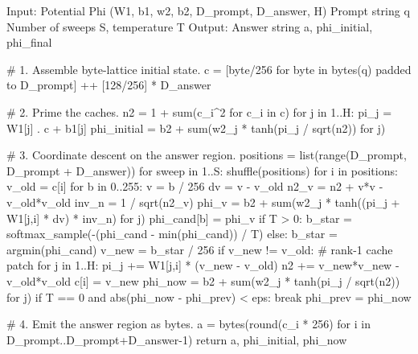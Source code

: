 \documentclass[
  11pt,
  a4paper,
]{article}
\newenvironment{Shaded}{\begin{snugshade}}{\end{snugshade}}
\newcommand{\NormalTok}[1]{#1}
\begin{document}
\begin{Shaded}
\begin{Highlighting}[]
\NormalTok{Input:  Potential Phi (W1, b1, w2, b2, D\_prompt, D\_answer, H)}
\NormalTok{        Prompt string q}
\NormalTok{        Number of sweeps S, temperature T}
\NormalTok{Output: Answer string a, phi\_initial, phi\_final}

\NormalTok{\# 1. Assemble byte{-}lattice initial state.}
\NormalTok{c = [byte/256 for byte in bytes(q) padded to D\_prompt] ++ [128/256] * D\_answer}

\NormalTok{\# 2. Prime the caches.}
\NormalTok{n2  = 1 + sum(c\_i\^{}2 for c\_i in c)}
\NormalTok{for j in 1..H:}
\NormalTok{    pi\_j = W1[j] . c + b1[j]}
\NormalTok{phi\_initial = b2 + sum(w2\_j * tanh(pi\_j / sqrt(n2)) for j)}

\NormalTok{\# 3. Coordinate descent on the answer region.}
\NormalTok{positions = list(range(D\_prompt, D\_prompt + D\_answer))}
\NormalTok{for sweep in 1..S:}
\NormalTok{    shuffle(positions)}
\NormalTok{    for i in positions:}
\NormalTok{        v\_old = c[i]}
\NormalTok{        for b in 0..255:}
\NormalTok{            v = b / 256}
\NormalTok{            dv = v {-} v\_old}
\NormalTok{            n2\_v  = n2 + v*v {-} v\_old*v\_old}
\NormalTok{            inv\_n = 1 / sqrt(n2\_v)}
\NormalTok{            phi\_v = b2 + sum(w2\_j * tanh((pi\_j + W1[j,i] * dv) * inv\_n) for j)}
\NormalTok{            phi\_cand[b] = phi\_v}
\NormalTok{        if T \textgreater{} 0:}
\NormalTok{            b\_star = softmax\_sample({-}(phi\_cand {-} min(phi\_cand)) / T)}
\NormalTok{        else:}
\NormalTok{            b\_star = argmin(phi\_cand)}
\NormalTok{        v\_new = b\_star / 256}
\NormalTok{        if v\_new != v\_old:}
\NormalTok{            \# rank{-}1 cache patch}
\NormalTok{            for j in 1..H:}
\NormalTok{                pi\_j += W1[j,i] * (v\_new {-} v\_old)}
\NormalTok{            n2 += v\_new*v\_new {-} v\_old*v\_old}
\NormalTok{            c[i] = v\_new}
\NormalTok{    phi\_now = b2 + sum(w2\_j * tanh(pi\_j / sqrt(n2)) for j)}
\NormalTok{    if T == 0 and abs(phi\_now {-} phi\_prev) \textless{} eps:}
\NormalTok{        break}
\NormalTok{    phi\_prev = phi\_now}

\NormalTok{\# 4. Emit the answer region as bytes.}
\NormalTok{a = bytes(round(c\_i * 256) for i in D\_prompt..D\_prompt+D\_answer{-}1)}
\NormalTok{return a, phi\_initial, phi\_now}
\end{Highlighting}
\end{Shaded}
\end{document}
